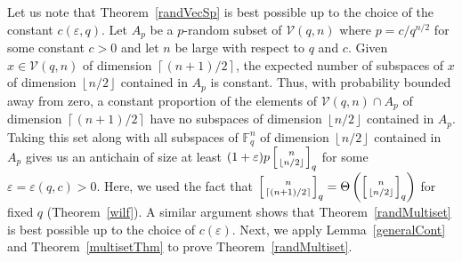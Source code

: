 \documentclass[11 pt]{article}
\theoremstyle{definition}
\theoremstyle{case}
\numberwithin{equation}{section}
\newcommand{\qbinom}[3]{\left[\genfrac{}{}{0pt}{}{#1}{#2}\right]_{#3}}
\newcommand{\Vectors}[2]{\mathcal{V}\left(#1,#2\right)}
\begin{document}
Let us note that Theorem~\ref{randVecSp} is best possible up to the choice of the constant $c(\varepsilon,q)$. Let $A_p$ be a $p$-random subset of $\Vectors{q}{n}$ where $p=c/q^{n/2}$ for some constant $c>0$ and let $n$ be large with respect to $q$ and $c$. Given $x\in\Vectors{q}{n}$ of dimension $\left\lceil (n+1)/2\right\rceil$, the expected number of subspaces of $x$ of dimension $\left\lfloor n/2\right\rfloor$ contained in $A_p$ is constant. Thus, with probability bounded away from zero, a constant proportion of the elements of $\Vectors{q}{n}\cap A_p$ of dimension $\left\lceil (n+1)/2\right\rceil$ have no subspaces of dimension $\left\lfloor n/2\right\rfloor$ contained in $A_p$. Taking this set along with all subspaces of $\mathbb{F}_q^n$ of dimension $\left \lfloor n/2\right\rfloor$ contained in $A_p$ gives us an antichain of size at least $(1+\varepsilon)p\qbinom{n}{\left\lfloor n/2\right\rfloor}{q}$ for some $\varepsilon=\varepsilon(q,c)>0$. Here, we used the fact that $\qbinom{n}{\left\lceil (n+1)/2\right\rceil}{q}=\Theta\left(\qbinom{n}{\left\lfloor n/2\right\rfloor}{q}\right)$ for fixed $q$ (Theorem~\ref{wilf}). A similar argument shows that Theorem~\ref{randMultiset} is best possible up to the choice of $c(\varepsilon)$. Next, we apply Lemma~\ref{generalCont} and Theorem~\ref{multisetThm} to prove Theorem~\ref{randMultiset}.
\end{document}
